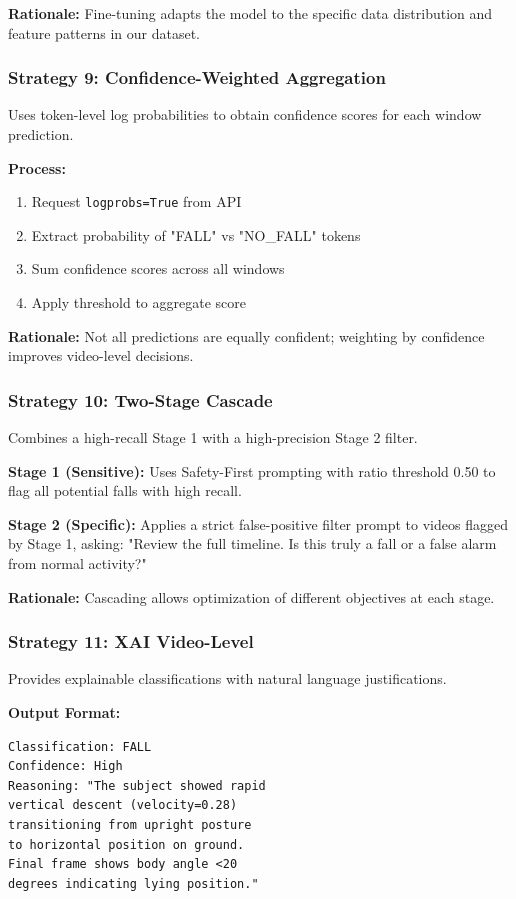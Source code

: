 \documentclass[conference]{IEEEtran}
\begin{document}
\textbf{Rationale:} Fine-tuning adapts the model to the specific data distribution and feature patterns in our dataset.

\subsubsection{Strategy 9: Confidence-Weighted Aggregation}
Uses token-level log probabilities to obtain confidence scores for each window prediction.

\textbf{Process:}
\begin{enumerate}
    \item Request \texttt{logprobs=True} from API
    \item Extract probability of "FALL" vs "NO\_FALL" tokens
    \item Sum confidence scores across all windows
    \item Apply threshold to aggregate score
\end{enumerate}

\textbf{Rationale:} Not all predictions are equally confident; weighting by confidence improves video-level decisions.

\subsubsection{Strategy 10: Two-Stage Cascade}
Combines a high-recall Stage 1 with a high-precision Stage 2 filter.

\textbf{Stage 1 (Sensitive):} Uses Safety-First prompting with ratio threshold 0.50 to flag all potential falls with high recall.

\textbf{Stage 2 (Specific):} Applies a strict false-positive filter prompt to videos flagged by Stage 1, asking: "Review the full timeline. Is this truly a fall or a false alarm from normal activity?"

\textbf{Rationale:} Cascading allows optimization of different objectives at each stage.

\subsubsection{Strategy 11: XAI Video-Level}
Provides explainable classifications with natural language justifications.

\textbf{Output Format:}
\begin{lstlisting}
Classification: FALL
Confidence: High
Reasoning: "The subject showed rapid 
vertical descent (velocity=0.28) 
transitioning from upright posture 
to horizontal position on ground. 
Final frame shows body angle <20 
degrees indicating lying position."
\end{lstlisting}
\end{document}

